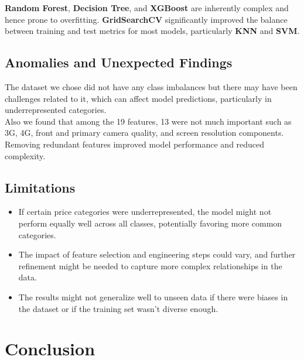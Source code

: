 \documentclass[12pt]{report}
\begin{document}
\textbf{Random Forest}, \textbf{Decision Tree}, and \textbf{XGBoost} are inherently complex and hence prone to overfitting. \textbf{GridSearchCV} significantly improved the balance between training and test metrics for most models, particularly \textbf{KNN} and \textbf{SVM}.

\section{Anomalies and Unexpected Findings}
The dataset we chose did not have any class imbalances but there may have been challenges related to it, which can affect model predictions, particularly in underrepresented categories. \\
Also we found that among the 19 features, 13 were not much important such as 3G, 4G, front and primary camera quality, and screen resolution components. Removing redundant features improved model performance and reduced complexity. \\	
\section{Limitations}
\vspace{-0.5em}
\begin{itemize}
	\setlength\itemsep{-1.25em}
	\item  If certain price categories were underrepresented, the model might not perform equally well across all classes, potentially favoring more common categories.
	\item The impact of feature selection and engineering steps could vary, and further refinement might be needed to capture more complex relationships in the data.
	\item The results might not generalize well to unseen data if there were biases in the dataset or if the training set wasn't diverse enough.
\end{itemize}

\chapter{Conclusion}
\end{document}
